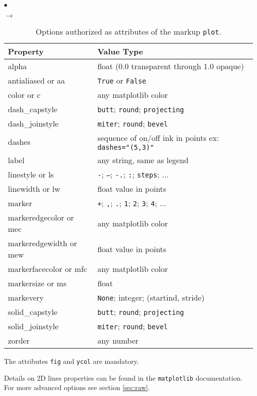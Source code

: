 \documentclass[a4paper,10pt,twoside]{csshortdoc}
\begin{document}
\begin{list}{$\bullet$}{}
\begin{list}{$\rightarrow$}{}
\begin{table}[htbp]
\begin{center}
\begin{tabular}{|l|l|}
\hline
\textbf{Property} & \textbf{Value Type} \\
\hline
alpha & float (0.0 transparent through 1.0 opaque) \\
antialiased or aa & \texttt{True} or \texttt{False} \\
color or c & any matplotlib color \\
dash\_capstyle & \texttt{butt}; \texttt{round}; \texttt{projecting} \\
dash\_joinstyle & \texttt{miter}; \texttt{round}; \texttt{bevel} \\
dashes & sequence of on/off ink in points ex: \texttt{dashes="(5,3)"} \\
label & any string, same as legend\\
linestyle or ls &  \texttt{-}; \texttt{--}; \texttt{-.}; \texttt{:}; \texttt{steps}; ... \\
linewidth or lw & float value in points \\
marker &  \texttt{+}; \texttt{,}; \texttt{.}; \texttt{1}; \texttt{2}; \texttt{3}; \texttt{4}; ... \\
markeredgecolor or mec & any matplotlib color \\
markeredgewidth or mew & float value in points \\
markerfacecolor or mfc & any matplotlib color \\
markersize or ms & float \\
markevery & \texttt{None}; integer; (startind, stride) \\
solid\_capstyle & \texttt{butt}; \texttt{round}; \texttt{projecting} \\
solid\_joinstyle & \texttt{miter}; \texttt{round}; \texttt{bevel} \\
zorder & any number \\
\hline
\end{tabular}
\end{center}
\caption{Options authorized as attributes of the markup \texttt{plot}.}
\label{table:curves}
\end{table}

\end{list}
\end{list}

The attributes \texttt{fig} and \texttt{ycol} are mandatory.

Details on 2D lines properties can be found in the \texttt{matplotlib}
documentation. For more advanced options see section \ref{sec:raw}.
\end{document}

